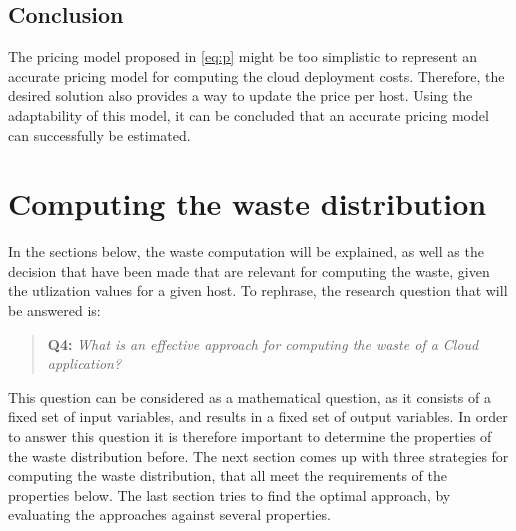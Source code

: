 \subsection{Conclusion}
The pricing model proposed in \autoref{eq:p} might be too simplistic to represent an accurate pricing model for computing the cloud deployment costs. Therefore, the desired solution also provides a way to update the price per host. Using the adaptability of this model, it can be concluded that an accurate pricing model can successfully be estimated.

\section{Computing the waste distribution} \label{sec:waste_into}
In the sections below, the waste computation will be explained, as well as the decision that have been made that are relevant for computing the waste, given the utlization values for a given host. To rephrase, the research question that will be answered is:

\begin{quote}
\textbf{Q4: }\textit{What is an effective approach for computing the waste of a Cloud application?}\\
\end{quote}

\noindent
This question can be considered as a mathematical question, as it consists of a fixed set of input variables, and results in a fixed set of output variables. In order to answer this question it is therefore important to determine the properties of the waste distribution before. The next section comes up with three strategies for computing the waste distribution, that all meet the requirements of the properties below. The last section tries to find the optimal approach, by evaluating the approaches against several properties.


